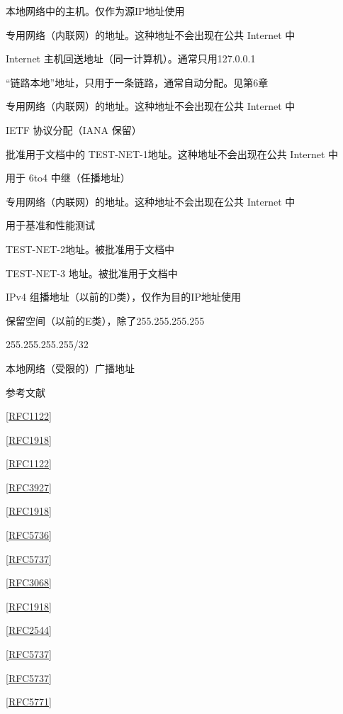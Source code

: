 本地网络中的主机。仅作为源IP地址使用

专用网络（内联网）的地址。这种地址不会出现在公共 Internet 中

Internet 主机回送地址（同一计算机）。通常只用127.0.0.1

“链路本地”地址，只用于一条链路，通常自动分配。见第6章

专用网络（内联网）的地址。这种地址不会出现在公共 Internet 中

IETF 协议分配（IANA 保留）

批准用于文档中的 TEST-NET-1地址。这种地址不会出现在公共 Internet 中

用于 6to4 中继（任播地址）

专用网络（内联网）的地址。这种地址不会出现在公共 Internet 中

用于基准和性能测试

TEST-NET-2地址。被批准用于文档中

TEST-NET-3 地址。被批准用于文档中

IPv4 组播地址（以前的D类），仅作为目的IP地址使用

保留空间（以前的E类），除了255.255.255.255

255.255.255.255/32

本地网络（受限的）广播地址

参考文献

\href{https://www.rfc-editor.org/rfc/rfc1122}{[RFC1122]}

\href{https://www.rfc-editor.org/rfc/rfc1918}{[RFC1918]}

\href{https://www.rfc-editor.org/rfc/rfc1122}{[RFC1122]}

\href{https://www.rfc-editor.org/rfc/rfc3927}{[RFC3927]}

\href{https://www.rfc-editor.org/rfc/rfc1918}{[RFC1918]}

\href{https://www.rfc-editor.org/rfc/rfc5736}{[RFC5736]}

\href{https://www.rfc-editor.org/rfc/rfc5737}{[RFC5737]}

\href{https://www.rfc-editor.org/rfc/rfc3068}{[RFC3068]}

\href{https://www.rfc-editor.org/rfc/rfc1918}{[RFC1918]}

\href{https://www.rfc-editor.org/rfc/rfc2544}{[RFC2544]}

\href{https://www.rfc-editor.org/rfc/rfc5737}{[RFC5737]}

\href{https://www.rfc-editor.org/rfc/rfc5737}{[RFC5737]}

\href{https://www.rfc-editor.org/rfc/rfc5771}{[RFC5771]}

